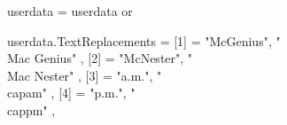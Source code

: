 %
%

\def\Mac{%
  \newbox\MacMBox%
  \setbox\MacMBox\hbox{M}%
  \newbox\MacCBox%
  \setbox\MacCBox\hbox{c}%
  \newbox\MacKernBox%
  \setbox\MacKernBox\hbox{\inframed[offset=\zeropoint, width=fit]{Mc}}%
  \def\MacDelta{\dimexpr\wd\MacKernBox-\wd\MacMBox-\wd\MacCBox\relax}%
  \def\MacUWidth{\dimexpr\wd\MacCBox-.75\MacDelta\relax}%
  \def\MacRule{\vrule width \MacUWidth height .04em depth \zeropoint \relax}%
  \def\MacKern{\dimexpr\wd\MacKernBox-\wd\MacMBox-\wd\MacCBox\relax}%
  \def\MacHeight{\dimexpr\ht\MacMBox-\ht\MacCBox\relax}%
  M{%
    \dontleavehmode{\raisebox{\MacHeight}\hbox{c}}%
    \kern-1.04\MacUWidth
    \MacRule
    \kern.08\MacUWidth
  }%
}%

\startluacode
userdata = userdata or {}

userdata.TextReplacements = { 
  [1] = { "McGenius", "\\Mac Genius" },
  [2] = { "McNester", "\\Mac Nester" },
  [3] = { "a.m.", "\\cap{am}" },
  [4] = { "p.m.", "\\cap{pm}" },
}
\stopluacode

